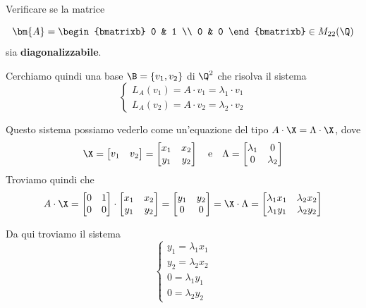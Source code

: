 \documentclass[11pt, a4paper, titlepage, oneside]{scrbook}
\begin{document}
\Esempio \nopagebreak

Verificare se la matrice \nopagebreak

\[\bm{A} = 
\begin{bmatrixb}
0 & 1 \\
0 & 0
\end{bmatrixb} \in M_{22}(\Q)
\]
sia \textbf{diagonalizzabile}. \nopagebreak

Cerchiamo quindi una base $\B = \{v_1, v_2\}$ di $\Q^2$ che risolva il sistema
\[
\begin{cases}
L_A(v_1) = A \cdot v_1 = \lambda_1 \cdot v_1 \\
L_A(v_2) = A \cdot v_2 = \lambda_2 \cdot v_2
\end{cases}
\]

Questo sistema possiamo vederlo come un'equazione del tipo $A \cdot \X = \Lambda \cdot \X$, dove 
\[\X = 
\begin{bmatrix}
    v_1 & v_2
\end{bmatrix} = \begin{bmatrix}
    x_1 & x_2 \\
    y_1 & y_2
\end{bmatrix}
\quad \text{e} \quad
\Lambda = \begin{bmatrix}
    \lambda_1 & 0 \\
    0 & \lambda_2
\end{bmatrix}
\]
Troviamo quindi che
\[A \cdot \X = \begin{bmatrix}
    0 & 1 \\
    0 & 0
\end{bmatrix} \cdot \begin{bmatrix}
    x_1 & x_2 \\
    y_1 & y_2
\end{bmatrix} = \begin{bmatrix}
y_1 & y_2 \\
0 & 0
\end{bmatrix} =\X \cdot \Lambda = \begin{bmatrix}
    \lambda_1 x_1 & \lambda_2 x_2 \\
    \lambda_1 y_1 & \lambda_2 y_2
\end{bmatrix}\]

Da qui troviamo il sistema
\[
\begin{cases}
y_1 = \lambda_1 x_1 \\
y_2 = \lambda_2 x_2 \\
0 = \lambda_1 y_1 \\
0 = \lambda_2 y_2
\end{cases}
\]
\end{document}
